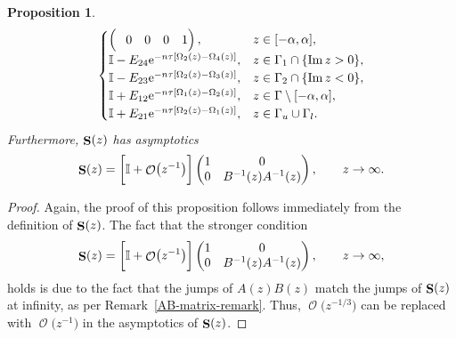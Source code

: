 \documentclass[pdftex]{sigma}
\DeclareMathOperator{\OO}{\mathcal{O}}
\DeclareMathOperator{\boldS}{{\bf S}}
\numberwithin{equation}{section}
\newtheorem{Proposition}[Theorem]{Proposition}
 { \theoremstyle{definition}
\newtheorem{Definition}[Theorem]{Definition}
\newtheorem{Note}[Theorem]{Note}
\newtheorem{Example}[Theorem]{Example}
\newtheorem{Remark}[Theorem]{Remark} }
\begin{document}
\begin{Proposition}
\begin{equation*}
\begin{cases}
\begin{pmatrix}
 \hphantom{-}0 & 0 & 0 & 1
 \end{pmatrix}, & z\in [-\alpha,\alpha],\\
 \mathbb{I} - E_{24}{\rm e}^{-n\tau[\Omega_2(z) - \Omega_4(z)]},
 & z \in \Gamma_1 \cap \{\operatorname{Im} z > 0\},\\
 \mathbb{I} - E_{23}{\rm e}^{-n\tau[\Omega_2(z) - \Omega_3(z)]},
 & z \in \Gamma_2 \cap \{\operatorname{Im} z < 0\},\\
 \mathbb{I} + E_{12}{\rm e}^{-n\tau[\Omega_1(z) - \Omega_2(z)]},
 & z\in \Gamma \setminus [-\alpha,\alpha],\\
 \mathbb{I} + E_{21}{\rm e}^{-n\tau[\Omega_{2}(z)-\Omega_{1}(z)]}, & z\in \Gamma_{u}\cup\Gamma_{l}.\\
 \end{cases}
 \end{equation*}
Furthermore, $\boldS(z)$ has asymptotics
\begin{equation*} %
 \boldS(z) =
 \biggl[\mathbb{I} + \OO\bigl(z^{-1}\bigr)\biggr]
 \begin{pmatrix}
 1 & 0\\
 0 & B^{-1}(z) A^{-1}(z)
 \end{pmatrix},
 \qquad z \to \infty .
 \end{equation*}
 \end{Proposition}
\begin{proof}
 Again, the proof of this proposition follows immediately from the definition of $\boldS(z)$. The fact that the stronger condition
 \begin{equation*}
 \boldS(z) =
 \biggl[\mathbb{I} + \OO\bigl(z^{-1}\bigr)\biggr]
 \begin{pmatrix}
 1 & 0\\
 0 & B^{-1}(z) A^{-1}(z)
 \end{pmatrix},
 \qquad z \to \infty,
 \end{equation*}
 holds is due to the fact that the jumps of $A(z)B(z)$ match the jumps of $\boldS(z)$ at infinity, as per Remark~\ref{AB-matrix-remark}. Thus,
 $\OO\bigl(z^{-1/3}\bigr)$ can be replaced with $\OO\bigl(z^{-1}\bigr)$ in the asymptotics of $\boldS(z)$.
\end{proof}
\end{document}
